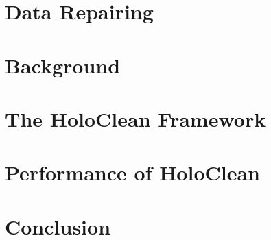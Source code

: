 
\section{Data Repairing}\label{sec:introduction}

\section{Background}\label{sec:background}

\section{The HoloClean Framework}\label{sec:framework}

\section{Performance of HoloClean}\label{sec:performance}

\section{Conclusion}\label{sec:conclusion}